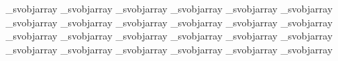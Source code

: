 {{{      \ifcase\fontdimen\indexa\_svobjarray
        \advance\cntf\@ne
      \fi
      \advance\indexa\cntDeltaBF
      \ifcase\fontdimen\indexa\_svobjarray
        \advance\cntf\@ne
      \fi
      \advance\indexa\cntDeltaBG
      \ifcase\fontdimen\indexa\_svobjarray
        \advance\cntf\@ne
      \fi
      \advance\indexa\cntDeltaBH
      \ifcase\fontdimen\indexa\_svobjarray
        \advance\cntf\@ne
      \fi
      \advance\indexa\cntDeltaCA
      \ifcase\fontdimen\indexa\_svobjarray
        \advance\cntf\@ne
      \fi
      \advance\indexa\cntDeltaCB
      \ifcase\fontdimen\indexa\_svobjarray
        \advance\cntf\@ne
      \fi
      \advance\indexa\cntDeltaCC
      \ifcase\fontdimen\indexa\_svobjarray
        \advance\cntf\@ne
      \fi
      \advance\indexa\cntDeltaCD
      \ifcase\fontdimen\indexa\_svobjarray
        \advance\cntf\@ne
      \fi
      \advance\indexa\cntDeltaCE
      \ifcase\fontdimen\indexa\_svobjarray
        \advance\cntf\@ne
      \fi
      \advance\indexa\cntDeltaCF
      \ifcase\fontdimen\indexa\_svobjarray
        \advance\cntf\@ne
      \fi
      \advance\indexa\cntDeltaCG
      \ifcase\fontdimen\indexa\_svobjarray
        \advance\cntf\@ne
      \fi
      \advance\indexa\cntDeltaCH
      \ifcase\fontdimen\indexa\_svobjarray
        \advance\cntf\@ne
      \fi
      \advance\indexa\cntDeltaDA
      \ifcase\fontdimen\indexa\_svobjarray
        \advance\cntf\@ne
      \fi
      \advance\indexa\cntDeltaDB
      \ifcase\fontdimen\indexa\_svobjarray
        \advance\cntf\@ne
      \fi
      \advance\indexa\cntDeltaDC
      \ifcase\fontdimen\indexa\_svobjarray
        \advance\cntf\@ne
      \fi
      \advance\indexa\cntDeltaDD
      \ifcase\fontdimen\indexa\_svobjarray
        \advance\cntf\@ne
      \fi
      \advance\indexa\cntDeltaDE
      \ifcase\fontdimen\indexa\_svobjarray
        \advance\cntf\@ne
      \fi
      \advance\indexa\cntDeltaDF
      \ifcase\fontdimen\indexa\_svobjarray
        \advance\cntf\@ne
      \fi
      \advance\indexa\cntDeltaDG
      \ifcase\fontdimen\indexa\_svobjarray
        \advance\cntf\@ne
      \fi
      \advance\indexa\cntDeltaDH
      \ifcase\fontdimen\indexa\_svobjarray
        \advance\cntf\@ne
      \fi
      \advance\indexa\cntDeltaEA
      \ifcase\fontdimen\indexa\_svobjarray
        \advance\cntf\@ne
      \fi
      \advance\indexa\cntDeltaEB
      \ifcase\fontdimen\indexa\_svobjarray
        \advance\cntf\@ne
      \fi
      \advance\indexa\cntDeltaEC
      \ifcase\fontdimen\indexa\_svobjarray
        \advance\cntf\@ne
      \fi
      \advance\indexa\cntDeltaED
      \ifcase\fontdimen\indexa\_svobjarray
}}}

